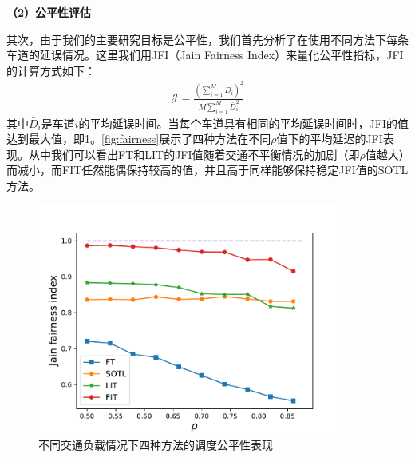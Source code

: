 \textbf{（2）公平性评估}

其次，由于我们的主要研究目标是公平性，我们首先分析了在使用不同方法下每条车道的延误情况。这里我们用JFI（Jain Fairness Index）来量化公平性指标，JFI的计算方式如下：
\begin{align}
    \mathcal{J}=\frac{\left(\sum_{i=1}^{M} \bar{D}_{i}\right)^{2}}{M \sum_{i=1}^{M} \bar{D}_{i}^{2}}
\end{align}
其中$\bar{D}_{i}$是车道$i$的平均延误时间。当每个车道具有相同的平均延误时间时，JFI的值达到最大值，即1。\autoref{fig:fairness}展示了四种方法在不同$\rho$值下的平均延迟的JFI表现。从中我们可以看出FT和LIT的JFI值随着交通不平衡情况的加剧（即$\rho$值越大）而减小，而FIT任然能偶保持较高的值，并且高于同样能够保持稳定JFI值的SOTL方法。
\begin{figure}[htb]
    \includegraphics[width=0.9\textwidth]{fig/fairness.pdf}
    \caption{不同交通负载情况下四种方法的调度公平性表现}
    \label{fig:fairness}
\end{figure}

